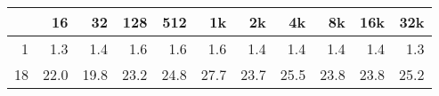 \begin{tabular}{r | r r r r r r r r r r}
 	 &16	 &32	 &128	 &512	 &1k	 &2k	 &4k	 &8k	 &16k	 &32k	\\ \hline
1	& 1.3	& 1.4	& 1.6	& 1.6	& 1.6	& 1.4	& 1.4	& 1.4	& 1.4	& 1.3	\\
18	& 22.0	& 19.8	& 23.2	& 24.8	& 27.7	& 23.7	& 25.5	& 23.8	& 23.8	& 25.2	\\
\end{tabular}
